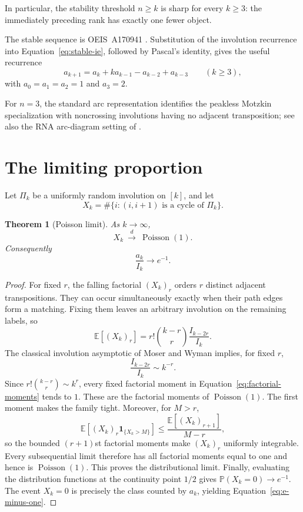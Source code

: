\documentclass[11pt]{article}
\newtheorem{theorem}{Theorem}[section]
\theoremstyle{definition}
\begin{document}
In particular, the stability threshold $n\ge k$ is sharp for every $k\ge3$:
the immediately preceding rank has exactly one fewer object.

The stable sequence is OEIS~A170941 \cite{OEISA170941}.  Substitution of the
involution recurrence into Equation~\eqref{eq:stable-ie}, followed by
Pascal's identity, gives the useful recurrence
\begin{equation}\label{eq:stable-recurrence}
 a_{k+1}=a_k+k a_{k-1}-a_{k-2}+a_{k-3}\qquad(k\ge3),
\end{equation}
with $a_0=a_1=a_2=1$ and $a_3=2$.

For $n=3$, the standard arc representation identifies the peakless Motzkin
specialization with noncrossing involutions having no adjacent transposition;
see also the RNA arc-diagram setting of \cite{GilLopez2023}.

\section{The limiting proportion}

Let $\Pi_k$ be a uniformly random involution on $[k]$, and let
\[
 X_k=\#\{i:(i,i+1)\text{ is a cycle of }\Pi_k\}.
\]

\begin{theorem}[Poisson limit]\label{thm:poisson}
As $k\to\infty$,
\[
 X_k\ \xrightarrow{d}\ \operatorname{Poisson}(1).
\]
Consequently
\begin{equation}\label{eq:e-minus-one}
 \frac{a_k}{I_k}\longrightarrow e^{-1}.
\end{equation}
\end{theorem}

\begin{proof}
For fixed $r$, the falling factorial $(X_k)_r$ orders $r$ distinct adjacent
transpositions.  They can occur simultaneously exactly when their path edges
form a matching.  Fixing them leaves an arbitrary involution on the remaining
labels, so
\begin{equation}\label{eq:factorial-moments}
 \mathbb E[(X_k)_r]
 =r!\binom{k-r}{r}\frac{I_{k-2r}}{I_k}.
\end{equation}
The classical involution asymptotic of Moser and Wyman
\cite{MoserWyman1955} implies, for fixed $r$,
\[
 \frac{I_{k-2r}}{I_k}\sim k^{-r}.
\]
Since $r!\binom{k-r}{r}\sim k^r$, every fixed factorial moment in
Equation~\eqref{eq:factorial-moments} tends to $1$.  These are the factorial
moments of $\operatorname{Poisson}(1)$.  The first moment makes the family
tight.  Moreover, for $M>r$,
\[
 \mathbb E\!\left[(X_k)_r\mathbf1_{\{X_k>M\}}\right]
 \le \frac{\mathbb E[(X_k)_{r+1}]}{M-r},
\]
so the bounded $(r+1)$st factorial moments make $(X_k)_r$ uniformly
integrable.  Every subsequential limit therefore has all factorial moments
equal to one and hence is $\operatorname{Poisson}(1)$.  This proves the
distributional limit.  Finally, evaluating the distribution functions at
the continuity point $1/2$ gives
$\mathbb P(X_k=0)\to e^{-1}$.  The event $X_k=0$ is precisely the class
counted by $a_k$, yielding Equation~\eqref{eq:e-minus-one}.
\end{proof}
\end{document}
